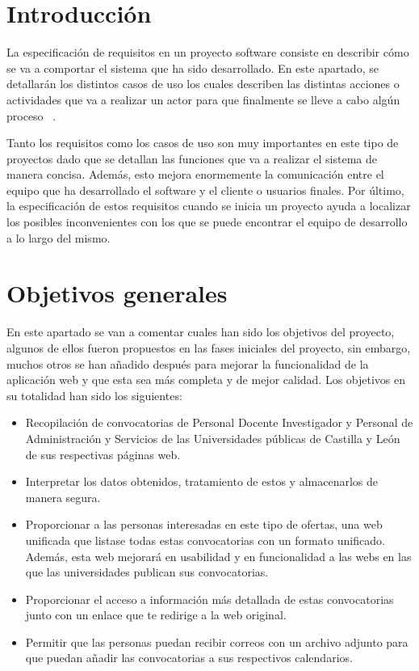 
\section{Introducción}

La especificación de requisitos en un proyecto software consiste en describir cómo se va a comportar el sistema que ha sido desarrollado. En este apartado, se detallarán los distintos casos de uso los cuales describen las distintas acciones o actividades que va a realizar un actor para que finalmente se lleve a cabo algún proceso ~\cite{especificacionrequisitos:latex}.

Tanto los requisitos como los casos de uso son muy importantes en este tipo de proyectos dado que se detallan las funciones que va a realizar el sistema de manera concisa. Además, esto mejora enormemente la comunicación entre el equipo que ha desarrollado el software y el cliente o usuarios finales. Por último, la especificación de estos requisitos cuando se inicia un proyecto ayuda a localizar los posibles inconvenientes con los que se puede encontrar el equipo de desarrollo a lo largo del mismo.

\section{Objetivos generales}

En este apartado se van a comentar cuales han sido los objetivos del proyecto, algunos de ellos fueron propuestos en las fases iniciales del proyecto, sin embargo, muchos otros se han añadido después para mejorar la funcionalidad de la aplicación web y que esta sea más completa y de mejor calidad. Los objetivos en su totalidad han sido los siguientes:

\begin{itemize}

\item Recopilación de convocatorias de Personal Docente Investigador y Personal de Administración y Servicios de las Universidades públicas de Castilla y León de sus respectivas páginas web. 

\item Interpretar los datos obtenidos, tratamiento de estos y almacenarlos de manera segura.

\item Proporcionar a las personas interesadas en este tipo de ofertas, una web unificada que listase todas estas convocatorias con un formato unificado. Además, esta web mejorará en usabilidad y en funcionalidad a las webs en las que las universidades publican sus convocatorias.

\item Proporcionar el acceso a información más detallada de estas convocatorias junto con un enlace que te redirige a la web original.

\item Permitir que las personas puedan recibir correos con un archivo adjunto para que puedan añadir las convocatorias a sus respectivos calendarios.

\end{itemize}

